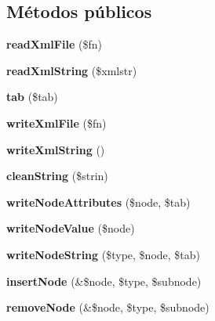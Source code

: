 \subsection*{\-Métodos públicos}
\begin{DoxyCompactItemize}
\item 
\hypertarget{classMyXml_a3a5ea00bcb3df045d4139e2a235f8a22}{{\bfseries read\-Xml\-File} (\$fn)}\label{classMyXml_a3a5ea00bcb3df045d4139e2a235f8a22}

\item 
\hypertarget{classMyXml_af4f787faf6b54c376a570f692c52051d}{{\bfseries read\-Xml\-String} (\$xmlstr)}\label{classMyXml_af4f787faf6b54c376a570f692c52051d}

\item 
\hypertarget{classMyXml_af11dcf960ad0c75397ebf347d879c388}{{\bfseries tab} (\$tab)}\label{classMyXml_af11dcf960ad0c75397ebf347d879c388}

\item 
\hypertarget{classMyXml_a055ad33e1423261776210b0676e09ab3}{{\bfseries write\-Xml\-File} (\$fn)}\label{classMyXml_a055ad33e1423261776210b0676e09ab3}

\item 
\hypertarget{classMyXml_a492e0260476d66ca7e2708f50c1c84da}{{\bfseries write\-Xml\-String} ()}\label{classMyXml_a492e0260476d66ca7e2708f50c1c84da}

\item 
\hypertarget{classMyXml_a276fe0044f6d61474726e3a2751908f8}{{\bfseries clean\-String} (\$strin)}\label{classMyXml_a276fe0044f6d61474726e3a2751908f8}

\item 
\hypertarget{classMyXml_afb7ddb2e7374cd53666ecf385e5d5be5}{{\bfseries write\-Node\-Attributes} (\$node, \$tab)}\label{classMyXml_afb7ddb2e7374cd53666ecf385e5d5be5}

\item 
\hypertarget{classMyXml_a7fc15bbfded7db0bd48351960e5e845d}{{\bfseries write\-Node\-Value} (\$node)}\label{classMyXml_a7fc15bbfded7db0bd48351960e5e845d}

\item 
\hypertarget{classMyXml_a76077b211289f21055bf6b3aecc0c8c8}{{\bfseries write\-Node\-String} (\$type, \$node, \$tab)}\label{classMyXml_a76077b211289f21055bf6b3aecc0c8c8}

\item 
\hypertarget{classMyXml_a5e8568f0e01d562a5e26813b46c31b2f}{{\bfseries insert\-Node} (\&\$node, \$type, \$subnode)}\label{classMyXml_a5e8568f0e01d562a5e26813b46c31b2f}

\item 
\hypertarget{classMyXml_ac6bd925dadb3166b08ac5e2cf17c59ef}{{\bfseries remove\-Node} (\&\$node, \$type, \$subnode)}\label{classMyXml_ac6bd925dadb3166b08ac5e2cf17c59ef}

\end{DoxyCompactItemize}
